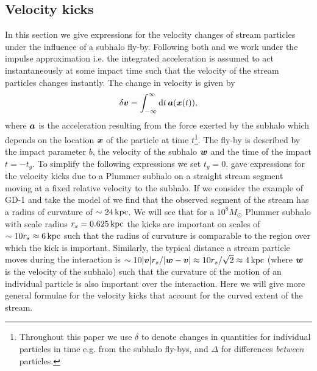 \documentclass[useAMS,usenatbib,fleqn,a4paper]{mn2e}
\def\d{{\rm d}}
\def\kpc{\,{\rm kpc}}
\newcommand{\bs}[1]{\bmath{#1}}
\begin{document}
\subsection{Velocity kicks}
In this section we give expressions for the velocity changes of stream particles under the influence of a subhalo fly-by. Following both \cite{YoonJohnstonHogg} and \cite{ErkalBelokurov2015} we work under the impulse approximation i.e. the integrated acceleration is assumed to act instantaneously at some impact time such that the velocity of the stream particles changes instantly. The change in velocity is given by
\begin{equation}
\delta\bs{v} = \int_{-\infty}^{\infty} \d t\,\bs{a}(\bs{x}(t)),
\end{equation}
where $\bs{a}$ is the acceleration resulting from the force exerted by the subhalo which depends on the location $\bs{x}$ of the particle at time $t$\footnote{Throughout this paper we use $\delta$ to denote changes in quantities for individual particles in time e.g. from the subhalo fly-bys, and $\Delta$ for differences \emph{between} particles.}. The fly-by is described by the impact parameter $b$, the velocity of the subhalo $\bs{w}$ and the time of the impact $t=-t_g$. To simplify the following expressions we set $t_g=0$. \cite{ErkalBelokurov2015} gave expressions for the velocity kicks due to a Plummer subhalo on a straight stream segment moving at a fixed relative velocity to the subhalo. If we consider the example of GD-1 and take the model of \cite{Koposov2010} we find that the observed segment of the stream has a radius of curvature of $\sim24\kpc$. We will see that for a $10^8M_\odot$ Plummer subhalo with scale radius $r_s=0.625\kpc$ the kicks are important on scales of $\sim10r_s\approx6\kpc$ such that the radius of curvature is comparable to the region over which the kick is important. Similarly, the typical distance a stream particle moves during the interaction is $\sim10|\bs{v}|r_s/|\bs{w}-\bs{v}|\approx10r_s/\sqrt{2}\approx4\kpc$ (where $\bs{w}$ is the velocity of the subhalo) such that the curvature of the motion of an individual particle is also important over the interaction. Here we will give more general formulae for the velocity kicks that account for the curved extent of the stream.
\end{document}

